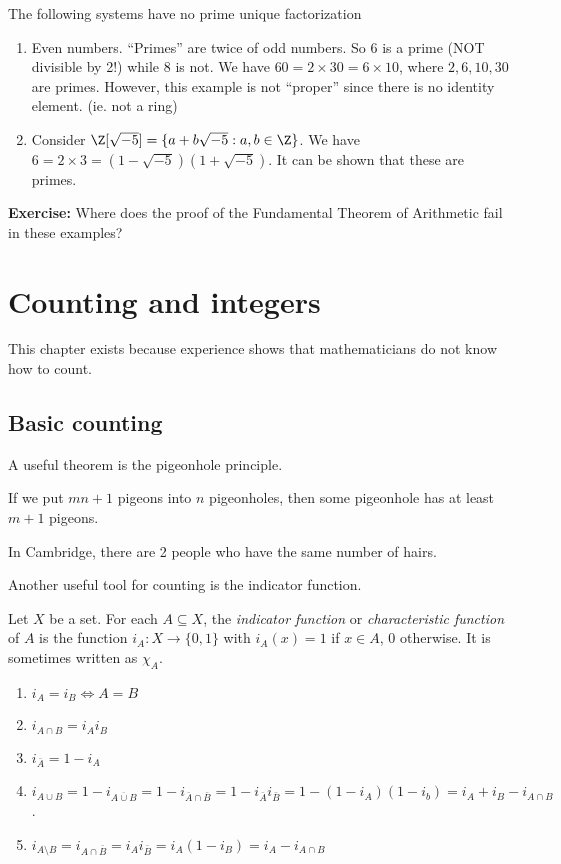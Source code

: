 \documentclass[a4paper]{article}
\begin{document}
\begin{eg}
  The following systems have no prime unique factorization
  \begin{enumerate}
    \item Even numbers. ``Primes'' are twice of odd numbers. So 6 is a prime (NOT divisible by 2!) while 8 is not. We have $60 = 2\times 30 = 6\times 10$, where $2, 6, 10, 30$ are primes. However, this example is not ``proper'' since there is no identity element. (ie. not a ring)
    \item Consider $\Z[\sqrt{-5}] = \{a + b\sqrt{-5} : a, b\in \Z\}$. We have $6 = 2\times 3 = (1 - \sqrt{-5})(1 + \sqrt{-5})$. It can be shown that these are primes.
  \end{enumerate}
\end{eg}
\noindent\textbf{Exercise:} Where does the proof of the Fundamental Theorem of Arithmetic fail in these examples?

\section{Counting and integers}
This chapter exists because experience shows that mathematicians do not know how to count.

\subsection{Basic counting}
A useful theorem is the pigeonhole principle.
\begin{thm}
  If we put $mn + 1$ pigeons into $n$ pigeonholes, then some pigeonhole has at least $m + 1$ pigeons.
\end{thm}

\begin{eg}
  In Cambridge, there are 2 people who have the same number of hairs.
\end{eg}

Another useful tool for counting is the indicator function.
\begin{defi}
  Let $X$ be a set. For each $A\subseteq X$, the \emph{indicator function} or \emph{characteristic function} of $A$ is the function $i_A: X\to \{0, 1\}$ with $i_A(x) = 1$ if $x\in A$, $0$ otherwise. It is sometimes written as $\chi_A$.
\end{defi}
\begin{prop}\leavevmode
  \begin{enumerate}
    \item $i_A = i_B \Leftrightarrow A = B$
    \item $i_{A\cap B} = i_A i_B$
    \item $i_{\bar{A}} = 1 - i_A$
    \item $i_{A\cup B} = 1 - i_{\overline{A\cup B}} = 1 - i_{\bar A\cap \bar B} = 1 - i_{\bar{A}}i_{\bar{B}} = 1 - (1 - i_A)(1 - i_b) = i_A + i_B - i_{A\cap B}$.
    \item $i_{A\setminus B} = i_{A\cap \bar B} = i_Ai_{\bar B} = i_A(1 - i_B) = i_A - i_{A\cap B}$
  \end{enumerate}
\end{prop}
\end{document}
